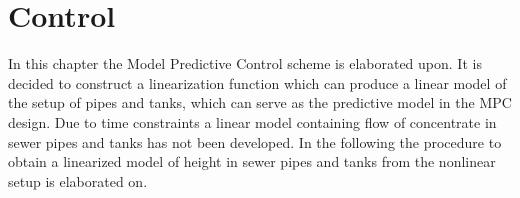 \chapter{Control}\label{ch:control}

In this chapter the Model Predictive Control scheme is elaborated upon. %
It is decided to construct a linearization function which can produce a linear model of the setup of pipes and tanks, which can serve as the predictive model in the MPC design.  
Due to time constraints a linear model containing flow of concentrate in sewer pipes and tanks has not been developed. 
In the following the procedure to obtain a linearized model of height in sewer pipes and tanks from the nonlinear setup is elaborated on.


